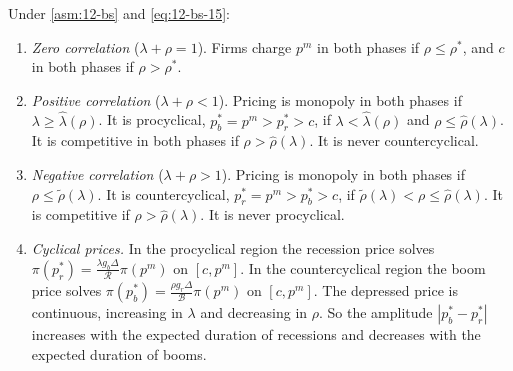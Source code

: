 \begin{proposition}\label{prop:12-bs-cycle}
Under \cref{asm:12-bs} and \eqref{eq:12-bs-15}:
\begin{enumerate}[label=(\roman*)]
\item \emph{Zero correlation} ($\lambda + \rho = 1$). Firms charge $p^m$ in both phases if $\rho \le \rho^*$, and $c$ in both
phases if $\rho > \rho^*$.
\item \emph{Positive correlation} ($\lambda + \rho < 1$). Pricing is monopoly in both phases if $\lambda \ge \hat\lambda(\rho)$. It is
procyclical, $p_b^* = p^m > p_r^* > c$, if $\lambda < \hat\lambda(\rho)$ and $\rho \le \hat\rho(\lambda)$. It is competitive in both
phases if $\rho > \hat\rho(\lambda)$. It is never countercyclical.
\item \emph{Negative correlation} ($\lambda + \rho > 1$). Pricing is monopoly in both phases if $\rho \le \tilde\rho(\lambda)$. It is
countercyclical, $p_r^* = p^m > p_b^* > c$, if $\tilde\rho(\lambda) < \rho \le \hat\rho(\lambda)$. It is competitive if
$\rho > \hat\rho(\lambda)$. It is never procyclical.
\item \emph{Cyclical prices.} In the procyclical region the recession price solves
$\pi(p_r^*) = \frac{\lambda g_b\Delta}{\mathcal R}\pi(p^m)$ on $[c, p^m]$. In the countercyclical region the boom price solves
$\pi(p_b^*) = \frac{\rho g_r\Delta}{\mathcal B}\pi(p^m)$ on $[c, p^m]$. The depressed price is continuous, increasing in $\lambda$
and decreasing in $\rho$. So the amplitude $|p_b^* - p_r^*|$ increases with the expected duration of recessions and
decreases with the expected duration of booms.
\end{enumerate}
\end{proposition}

